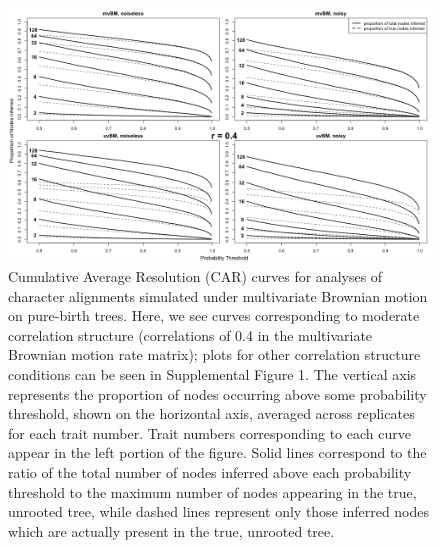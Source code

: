 \begin{figure}[h]
\centering
\includegraphics[width=160mm]{figures/CARcurvesPBT.png}
\caption[Cumulative Average Resolution Curves for the Brownian Motion Simulation Study, Idealized Conditions]{Cumulative Average Resolution (CAR) curves for analyses of character alignments simulated under multivariate Brownian motion on pure-birth trees. Here, we see curves corresponding to moderate correlation structure (correlations of 0.4 in the multivariate Brownian motion rate matrix); plots for other correlation structure conditions can be seen in Supplemental Figure 1. The vertical axis represents the proportion of nodes occurring above some probability threshold, shown on the horizontal axis, averaged across replicates for each trait number. Trait numbers corresponding to each curve appear in the left portion of the figure. Solid lines correspond to the ratio of the total number of nodes inferred above each probability threshold to the maximum number of nodes appearing in the true, unrooted tree, while dashed lines represent only those inferred nodes which are actually present in the true, unrooted tree. 
\label{overflow}
\label{fig:carCurvePBT}
}
\end{figure}

